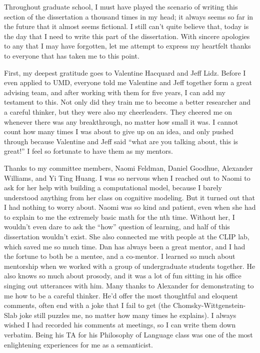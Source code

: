 Throughout graduate school, I must have played the scenario of writing this section of the dissertation a thousand times in my head; it always seems so far in the future that it almost seems fictional. I still can’t quite believe that, today is the day that I need to write this part of the dissertation. With sincere apologies to any that I may have forgotten, let me attempt to express my heartfelt thanks to everyone that has taken me to this point.
 
First, my deepest gratitude goes to Valentine Hacquard and Jeff Lidz. Before I even applied to UMD, everyone told me Valentine and Jeff together form a great advising team, and after working with them for five years, I can add my testament to this. Not only did they train me to become a better researcher and a careful thinker, but they were also my cheerleaders. They cheered me on whenever there was any breakthrough, no matter how small it was. I cannot count how many times I was about to give up on an idea, and only pushed through because Valentine and Jeff said “what are you talking about, this is great!” I feel so fortunate to have them as my mentors.
 
Thanks to my committee members, Naomi Feldman, Daniel Goodhue, Alexander Williams, and Yi Ting Huang. I was so nervous when I reached out to Naomi to ask for her help with building a computational model, because I barely understood anything from her class on cognitive modeling. But it turned out that I had nothing to worry about. Naomi was so kind and patient, even when she had to explain to me the extremely basic math for the nth time. Without her, I wouldn’t even dare to ask the ``how” question of learning, and half of this dissertation wouldn’t exist. She also connected me with people at the CLIP lab, which saved me so much time. Dan has always been a great mentor, and I had the fortune to both be a mentee, and a co-mentor. I learned so much about mentorship when we worked with a group of undergraduate students together. He also knows so much about prosody, and it was a lot of fun sitting in his office singing out utterances with him. Many thanks to Alexander for demonstrating to me how to be a careful thinker. He’d offer the most thoughtful and eloquent comments, often end with a joke that I fail to get (the Chomsky-Wittgenstein-Slab joke still puzzles me, no matter how many times he explains). I always wished I had recorded his comments at meetings, so I can write them down verbatim. Being his TA for his Philosophy of Language class was one of the most enlightening experiences for me as a semanticist.
 
